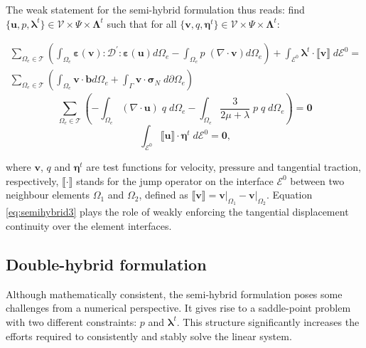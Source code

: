 \documentclass{wccm2024}
\begin{document}
The weak statement for the semi-hybrid formulation thus reads: find $\{\mathbf{u},p,\boldsymbol{\lambda}^t\} \in \mathcal{V} \times \Psi \times \boldsymbol{\Lambda}^t$ such that for all $\{\mathbf{v},q,\boldsymbol{\eta}^t\} \in \mathcal{V}\times \Psi \times \boldsymbol{\Lambda}^t$:

\begin{equation} \label{eq:semihybrid1}
    \begin{split}
        \sum_{\Omega_e \in \mathcal{T}} \left( \int_{\Omega_e} \boldsymbol{\varepsilon}(\mathbf{v}) : \mathcal{D}^{'} : \boldsymbol{\varepsilon}(\mathbf{u}) d\Omega_e - \int_{\Omega_e} p\; (\nabla \cdot \mathbf{v}) d\Omega_e \right) + \int_{\mathcal{E}^0} \boldsymbol{\lambda}^t \cdot \llbracket \mathbf{v} \rrbracket \;d\mathcal{E}^0 = \\ \sum_{\Omega_e \in \mathcal{T}} \left( \int_{\Omega_e} \mathbf{v} \cdot \mathbf{b} d\Omega_e + \int_{\Gamma} \mathbf{v} \cdot \boldsymbol{\sigma}_N \; d\partial\Omega_e \right)
    \end{split}
\end{equation}
\begin{equation} \label{eq:semihybrid2}
    \sum_{\Omega_e \in \mathcal{T}} \left(-\int_{\Omega_e} (\nabla \cdot \mathbf{u}) \;q\; d\Omega_e -\int_{\Omega_e} \frac{3}{2\mu+\lambda}\;p\; q\; d\Omega_e \right) = \mathbf{0}
\end{equation}
\begin{equation} \label{eq:semihybrid3}
    \int_{\mathcal{E}^0} \llbracket \mathbf{u} \rrbracket \cdot \mathbf{\eta}^t \;d\mathcal{E}^0 = \mathbf{0} \text{,}
\end{equation}

\noindent where $\mathbf{v}$, $q$ and $\boldsymbol{\eta}^t$ are test functions for velocity, pressure and tangential traction, respectively, $\llbracket \cdot \rrbracket$ stands for the jump operator on the interface $\mathcal{E}^0$ between two neighbour elements $\Omega_1$ and $\Omega_2$, defined as $\llbracket \mathbf{v} \rrbracket = \mathbf{v} \vert_{\Omega_1} - \mathbf{v} \vert_{\Omega_2}$. Equation \eqref{eq:semihybrid3} plays the role of weakly enforcing the tangential displacement continuity over the element interfaces.

\subsection{Double-hybrid formulation}

Although mathematically consistent, the semi-hybrid formulation poses some challenges from a numerical perspective. It gives rise to a saddle-point problem with two different constraints: $p$ and $\boldsymbol{\lambda}^t$. This structure significantly increases the efforts required to consistently and stably solve the linear system.
\end{document}
